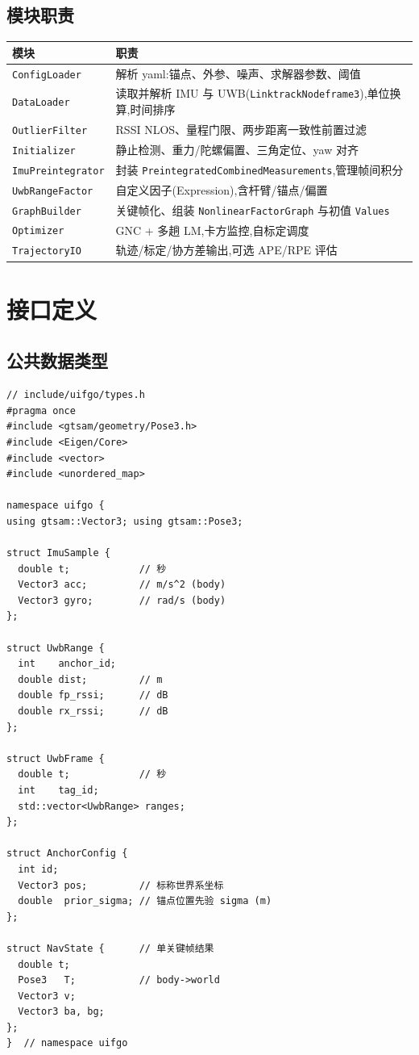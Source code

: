\documentclass[11pt,a4paper]{report}
\begin{document}
\section{模块职责}
\begin{longtable}{l p{9.5cm}}
\toprule
模块 & 职责 \\
\midrule
\texttt{ConfigLoader} & 解析 yaml:锚点、外参、噪声、求解器参数、阈值 \\
\texttt{DataLoader} & 读取并解析 IMU 与 UWB(\texttt{LinktrackNodeframe3}),单位换算,时间排序 \\
\texttt{OutlierFilter} & RSSI NLOS、量程门限、两步距离一致性前置过滤 \\
\texttt{Initializer} & 静止检测、重力/陀螺偏置、三角定位、yaw 对齐 \\
\texttt{ImuPreintegrator} & 封装 \texttt{PreintegratedCombinedMeasurements},管理帧间积分 \\
\texttt{UwbRangeFactor} & 自定义因子(Expression),含杆臂/锚点/偏置 \\
\texttt{GraphBuilder} & 关键帧化、组装 \texttt{NonlinearFactorGraph} 与初值 \texttt{Values} \\
\texttt{Optimizer} & GNC + 多趟 LM,卡方监控,自标定调度 \\
\texttt{TrajectoryIO} & 轨迹/标定/协方差输出,可选 APE/RPE 评估 \\
\bottomrule
\end{longtable}

\chapter{接口定义}

\section{公共数据类型}
\begin{lstlisting}[style=cpp]
// include/uifgo/types.h
#pragma once
#include <gtsam/geometry/Pose3.h>
#include <Eigen/Core>
#include <vector>
#include <unordered_map>

namespace uifgo {
using gtsam::Vector3; using gtsam::Pose3;

struct ImuSample {
  double t;            // 秒
  Vector3 acc;         // m/s^2 (body)
  Vector3 gyro;        // rad/s (body)
};

struct UwbRange {
  int    anchor_id;
  double dist;         // m
  double fp_rssi;      // dB
  double rx_rssi;      // dB
};

struct UwbFrame {
  double t;            // 秒
  int    tag_id;
  std::vector<UwbRange> ranges;
};

struct AnchorConfig {
  int id;
  Vector3 pos;         // 标称世界系坐标
  double  prior_sigma; // 锚点位置先验 sigma (m)
};

struct NavState {      // 单关键帧结果
  double t;
  Pose3   T;           // body->world
  Vector3 v;
  Vector3 ba, bg;
};
}  // namespace uifgo
\end{lstlisting}
\end{document}
